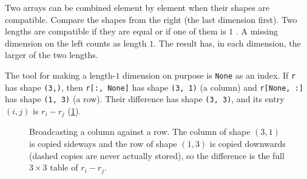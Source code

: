 \begin{workdef}[broadcasting]
Two arrays can be combined element by element when their shapes are compatible. Compare the shapes from the right (the last dimension first). Two lengths are compatible if they are equal or if one of them is $1$ . A missing dimension on the left counts as length $1$. The result has, in each dimension, the larger of the two lengths.
\end{workdef}

The tool for making a length-$1$ dimension on purpose is \texttt{None} as an index. If \texttt{r} has shape \texttt{(3,)}, then \texttt{r[:, None]} has shape \texttt{(3, 1)} (a column) and \texttt{r[None, :]} has shape \texttt{(1, 3)} (a row). Their difference has shape \texttt{(3, 3)}, and its entry $(i,j)$ is $r_i-r_j$ (\cref{T0a:fig:broadcast}).


\begin{figure}[htbp]
\centering
{}
\caption{Broadcasting a column against a row. The column of shape $(3,1)$ is copied sideways and the row of shape $(1,3)$ is copied downwards (dashed copies are never actually stored), so the difference is the full $3\times3$ table of $r_i-r_j$.}
\label{T0a:fig:broadcast}
\end{figure}

